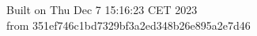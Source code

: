 {\noindent Built on Thu Dec  7 15:16:23 CET 2023} \\ 
 {\noindent from 351ef746c1bd7329bf3a2ed348b26e895a2e7d46}
